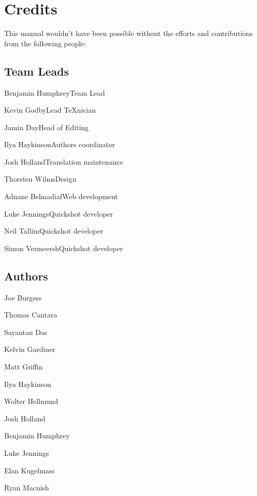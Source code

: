 \chapter{Credits}
\label{ch:credits}

This manual wouldn't have been possible without the efforts and contributions from the following people:

\section{Team Leads}

\begingroup
\parindent0pt
\parskip0pt
\par Benjamin Humphrey\dash Team Lead
\par Kevin Godby\dash Lead \TeX{}nician
\par Jamin Day\dash Head of Editing
\par Ilya Haykinson\dash Authors coordinator
\par Josh Holland\dash Translation maintenance
\par Thorsten Wilms\dash Design
\par Adnane Belmadiaf\dash Web development
\par Luke Jennings\dash Quickshot developer
\par Neil Tallim\dash Quickshot developer
\par Simon Vermeersh\dash Quickshot developer
\endgroup

\section{Authors}

\vspace{-1\baselineskip}
\begin{credits}
  \item Joe Burgess
  \item Thomas Cantara
  \item Sayantan Das
  \item Kelvin Gardiner
  \item Matt Griffin
  \item Ilya Haykinson
  \item Wolter Hellmund
  \item Josh Holland
  \item Benjamin Humphrey
  \item Luke Jennings
  \item Elan Kugelmass
  \item Ryan Macnish
\end{credits}


